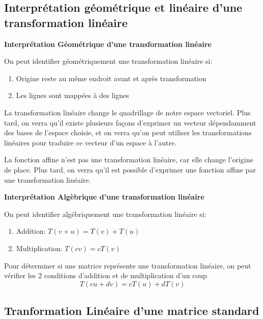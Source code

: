 \documentclass{article}
\begin{document}
\subsection{Interprétation géométrique et linéaire d'une transformation linéaire}

\textbf{Interprétation Géométrique d'une transformation linéaire}

On peut identifier géométriquement une transformation linéaire si:
\begin{enumerate}
    \item Origine reste au même endroit avant et après transformation
    \item Les lignes sont mappées à des lignes
\end{enumerate}

\begin{remark}
    La transformation linéaire change le quadrillage de notre espace vectoriel.
    Plus tard, on verra qu'il existe plusieurs façons d'exprimer un vecteur
    dépendamment des bases de l'espace choisie, et on verra qu'on peut
    utiliser les transformations linéaires pour traduire ce vecteur d'un
    espace à l'autre.
\end{remark}

\begin{proposition}[f(x) = ax+b n'est pas une transformation linéaire]
    La fonction affine n'est pas une transformation linéaire, car elle change
    l'origine de place. Plus tard, on verra qu'il est possible d'exprimer
    une fonction affine par une transformation linéaire.
\end{proposition}

\textbf{Interprétation Algèbrique d'une transformation linéaire}

On peut identifier algébriquement une transformation linéaire si:
\begin{enumerate}
    \item Addition: $ T(v+u) = T(v) + T(u)$
    \item Multiplication: $ T(cv) = c T(v) $
\end{enumerate}

\begin{remark}
    Pour déterminer si une matrice représente une transformation linéaire, on
    peut vérifier les 2 conditions d'addition et de multiplication d'un coup
    $$ T(cu + dv) = cT(u) + dT(v) $$
\end{remark}

\subsection{Tranformation Linéaire d'une matrice standard}
\end{document}
